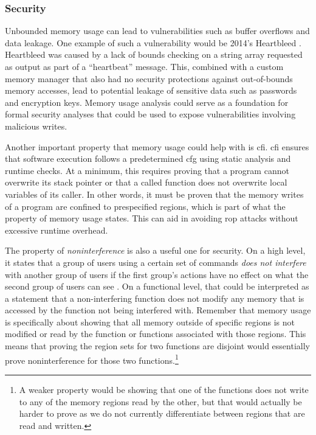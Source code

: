 \subsubsection{Security}
Unbounded memory usage can lead to vulnerabilities such as buffer overflows and data leakage.
One example of such a vulnerability would be 2014's Heartbleed \autocite{heartbleed}.
Heartbleed was caused by a lack of bounds checking on a string array requested as output as part of a ``heartbeat'' message.
This, combined with a custom memory manager that also had no security protections against out-of-bounds memory accesses, lead to potential leakage of sensitive data such as passwords and encryption keys.
Memory usage analysis could serve as a foundation for formal security analyses that could be used to expose vulnerabilities involving malicious writes.

Another important property that memory usage could help with is \ac{cfi}.
\Ac{cfi} ensures that software execution follows a predetermined \ac{cfg} using static analysis and runtime checks.
At a minimum, this requires proving that a program cannot overwrite its stack pointer or that a called function does not overwrite local variables of its caller.
In other words, it must be proven that the memory writes of a program are confined to prespecified regions, which is part of what the property of memory usage states.
This can aid in avoiding \ac{rop} attacks without excessive runtime overhead.

The property of \emph{noninterference} is also a useful one for security.
On a high level, it states that a group of users using a certain set of commands \emph{does not interfere} with another group of users if the first group's actions have no effect on what the second group of users can see
\autocite{goguen1982security,rushby1992noninterference}.
On a functional level, that could be interpreted as a statement that a non-interfering function does not modify any memory that is accessed by the function not being interfered with.
Remember that memory usage is specifically about showing that all memory outside of specific regions is not modified or read by the function or functions associated with those regions.
This means that proving the region sets for two functions are disjoint would essentially prove noninterference for those two functions.\footnote{%
  A weaker property would be showing that one of the functions does not write
  to any of the memory regions read by the other, but that would actually be harder to prove as we do not currently differentiate between regions that are read and written.%
}

